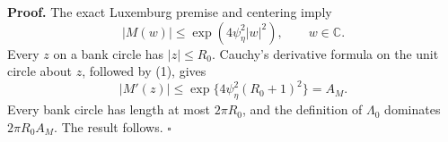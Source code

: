 \textbf{Proof.}
The exact Luxemburg premise and centering imply
\[
 |M(w)|\le\exp(4\psi_\eta^2|w|^2),\qquad w\in\mathbb C. \tag{1}
\]
Every \(z\) on a bank circle has \(|z|\le R_0\). Cauchy's derivative formula on the unit circle about \(z\), followed by (1), gives
\[
 |M'(z)|\le\exp\{4\psi_\eta^2(R_0+1)^2\}=A_M. \tag{2}
\]
Every bank circle has length at most \(2\pi R_0\), and the definition of \(\Lambda_0\) dominates \(2\pi R_0A_M\). The result follows. \(\square\)